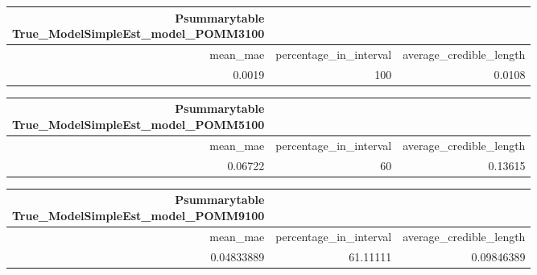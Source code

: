 \begin{longtable}{rrr}
\caption*{
{\large Psummarytable} \\ 
{\small True\_ModelSimpleEst\_model\_POMM3100}
} \\ 
\toprule
mean\_mae & percentage\_in\_interval & average\_credible\_length \\ 
\midrule
0.0019 & 100 & 0.0108 \\ 
\bottomrule
\end{longtable}

\begin{longtable}{rrr}
\caption*{
{\large Psummarytable} \\ 
{\small True\_ModelSimpleEst\_model\_POMM5100}
} \\ 
\toprule
mean\_mae & percentage\_in\_interval & average\_credible\_length \\ 
\midrule
0.06722 & 60 & 0.13615 \\ 
\bottomrule
\end{longtable}


\begin{longtable}{rrr}
\caption*{
{\large Psummarytable} \\ 
{\small True\_ModelSimpleEst\_model\_POMM9100}
} \\ 
\toprule
mean\_mae & percentage\_in\_interval & average\_credible\_length \\ 
\midrule
0.04833889 & 61.11111 & 0.09846389 \\ 
\bottomrule
\end{longtable}

